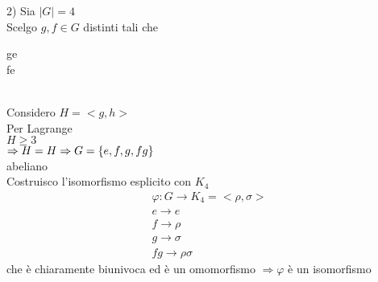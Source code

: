 \documentclass[12px]{article}
\begin{document}
		2) Sia $|G| = 4$\\
		Scelgo  $g,f\in G$ distinti tali che \begin{cases}
			g\neq e\\
			f\neq e
		\end{cases}\\
		Considero $H = <g,h>$ \\
		Per Lagrange\\
		$H \geq 3$\\
		$ \Rightarrow H = H\\
		\Rightarrow G = \{e,f,g,fg\}$\\
		abeliano\\
		Costruisco l'isomorfismo esplicito con $K_4$\\
		\begin{gather*}
			\varphi:G \rightarrow K_4 = <\rho,\sigma>\\
			e \rightarrow e\\
			f \rightarrow\rho\\
			g \rightarrow\sigma\\
			fg \rightarrow\rho\sigma
		\end{gather*}
		che è chiaramente biunivoca ed è un omomorfismo $ \Rightarrow \varphi$ è un isomorfismo
		
		\newpage
\end{document}

